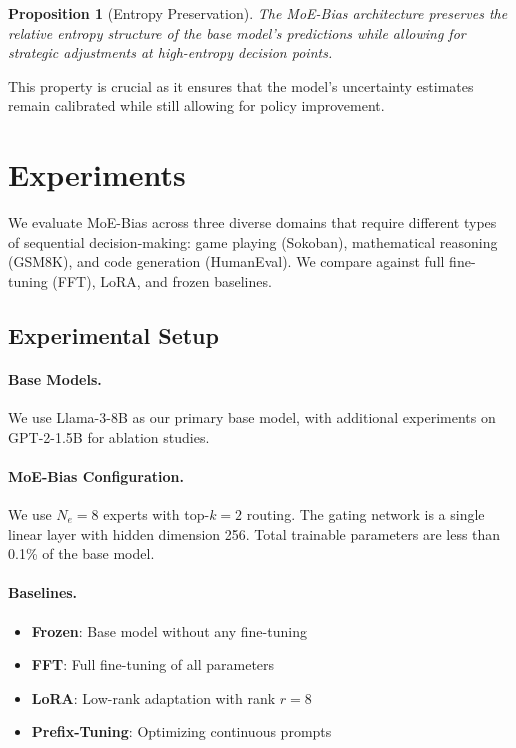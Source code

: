 \documentclass{article}
\newtheorem{proposition}[theorem]{Proposition}
\begin{document}
\begin{proposition}[Entropy Preservation]
The MoE-Bias architecture preserves the relative entropy structure of the base model's predictions while allowing for strategic adjustments at high-entropy decision points.
\end{proposition}

This property is crucial as it ensures that the model's uncertainty estimates remain calibrated while still allowing for policy improvement.


\section{Experiments}

We evaluate MoE-Bias across three diverse domains that require different types of sequential decision-making: game playing (Sokoban), mathematical reasoning (GSM8K), and code generation (HumanEval). We compare against full fine-tuning (FFT), LoRA, and frozen baselines.

\subsection{Experimental Setup}

\paragraph{Base Models.} We use Llama-3-8B \citep{touvron2023llama} as our primary base model, with additional experiments on GPT-2-1.5B for ablation studies.

\paragraph{MoE-Bias Configuration.} We use $N_e = 8$ experts with top-$k = 2$ routing. The gating network is a single linear layer with hidden dimension 256. Total trainable parameters are less than 0.1\% of the base model.

\paragraph{Baselines.} 
\begin{itemize}
    \item \textbf{Frozen}: Base model without any fine-tuning
    \item \textbf{FFT}: Full fine-tuning of all parameters
    \item \textbf{LoRA}: Low-rank adaptation with rank $r=8$
    \item \textbf{Prefix-Tuning}: Optimizing continuous prompts
\end{itemize}
\end{document}
